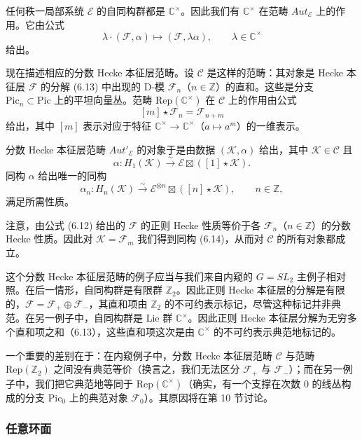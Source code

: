 \documentclass[11pt,a4paper]{article}
\begin{document}
任何秩一局部系统 $\mathcal{E}$ 的自同构群都是 $\mathbb{C}^\times$。因此我们有 $\mathbb{C}^\times$ 在范畴 $Aut_{\mathcal{E}}$ 上的作用。它由公式
\[
\lambda\cdot(\mathcal{F},\alpha)\mapsto(\mathcal{F},\lambda\alpha),\qquad \lambda\in\mathbb{C}^\times
\]
给出。

现在描述相应的分数 Hecke 本征层范畴。设 $\mathcal{C}$ 是这样的范畴：其对象是 Hecke 本征层 $\mathcal{F}$ 的分解 (6.13) 中出现的 D-模 $\mathcal{F}_n$（$n\in\mathbb{Z}$）的直和。这些是分支 $\mathrm{Pic}_n\subset\mathrm{Pic}$ 上的平坦向量丛。范畴 $\mathrm{Rep}(\mathbb{C}^\times)$ 在 $\mathcal{C}$ 上的作用由公式
\[
[m]\star\mathcal{F}_n = \mathcal{F}_{n+m}
\]
给出，其中 $[m]$ 表示对应于特征 $\mathbb{C}^\times\to\mathbb{C}^\times$（$a\mapsto a^m$）的一维表示。

分数 Hecke 本征层范畴 $Aut'_{\mathcal{E}}$ 的对象于是由数据 $(\mathcal{K},\alpha)$ 给出，其中 $\mathcal{K}\in\mathcal{C}$ 且
\begin{equation}\tag{6.14}
\alpha : H_1(\mathcal{K})\xrightarrow{\sim}\mathcal{E}\boxtimes([1]\star\mathcal{K}).
\end{equation}
同构 $\alpha$ 给出唯一的同构
\[
\alpha_n : H_n(\mathcal{K})\xrightarrow{\sim}\mathcal{E}^{\otimes n}\boxtimes([n]\star\mathcal{K}),\qquad n\in\mathbb{Z},
\]
满足所需性质。


注意，由公式 (6.12) 给出的 $\mathcal{F}$ 的正则 Hecke 性质等价于各 $\mathcal{F}_n$（$n\in\mathbb{Z}$）的分数 Hecke 性质。因此对 $\mathcal{K} = \mathcal{F}_m$ 我们得到同构 (6.14)，从而对 $\mathcal{C}$ 的所有对象都成立。

这个分数 Hecke 本征层范畴的例子应当与我们来自内窥的 $G = SL_2$ 主例子相对照。在后一情形，自同构群是有限群 $\mathbb{Z}_2$。因此正则 Hecke 本征层的分解是有限的，$\mathcal{F} = \mathcal{F}_+\oplus\mathcal{F}_-$，其直和项由 $\mathbb{Z}_2$ 的不可约表示标记，尽管这种标记并非典范。在另一例子中，自同构群是 Lie 群 $\mathbb{C}^\times$。因此正则 Hecke 本征层分解为无穷多个直和项之和（6.13），这些直和项这次是由 $\mathbb{C}^\times$ 的不可约表示典范地标记的。

一个重要的差别在于：在内窥例子中，分数 Hecke 本征层范畴 $\mathcal{C}$ 与范畴 $\mathrm{Rep}(\mathbb{Z}_2)$ 之间没有典范等价（换言之，我们无法区分 $\mathcal{F}_+$ 与 $\mathcal{F}_-$）；而在另一例子中，我们把它典范地等同于 $\mathrm{Rep}(\mathbb{C}^\times)$（确实，有一个支撑在次数 0 的线丛构成的分支 $\mathrm{Pic}_0$ 上的典范对象 $\mathcal{F}_0$）。其原因将在第 10 节讨论。

\subsubsection{任意环面}
\end{document}
